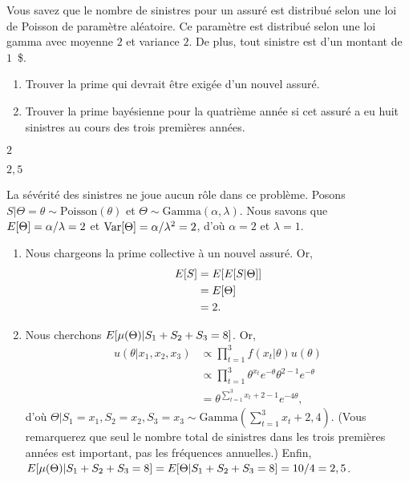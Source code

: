 \begin{exercice}
  Vous savez que le nombre de sinistres pour un assuré est distribué
  selon une loi de Poisson de paramètre aléatoire. Ce paramètre est
  distribué selon une loi gamma avec moyenne $2$ et variance $2$. De plus,
  tout sinistre est d'un montant de $1$~\$.
  \begin{enumerate}
  \item Trouver la prime qui devrait être exigée d'un nouvel assuré.
  \item Trouver la prime bayésienne pour la quatrième année si cet
    assuré a eu huit sinistres au cours des trois premières années.
  \end{enumerate}
  \begin{rep}
    \begin{inparaenum}
    \item $2$
    \item $2,5$
    \end{inparaenum}
  \end{rep}
  \begin{sol}
    La sévérité des sinistres ne joue aucun rôle dans ce problème.
    Posons $S|\Theta = \theta \sim \text{Poisson}(\theta)$ et
    $\Theta \sim \text{Gamma}(\alpha, \lambda)$. Nous savons que
    $E [ \Theta ] = \alpha/\lambda = 2$ et
    $\operatorname{Var} [ \Theta ] = \alpha/\lambda^2 = 2$, d'où $\alpha = 2$ et
    $\lambda = 1$.
    \begin{enumerate}
    \item Nous chargeons la prime collective à un nouvel assuré. Or,
      \begin{align*}
        E [ S ]
        &= E [ E [ S|\Theta ] ] \\
        &= E [ \Theta ] \\
        &= 2.
      \end{align*}
    \item Nous cherchons $E [ \mu(\Theta)|S_1 + S_2 + S_3 = 8 ]$. Or,
      \begin{align*}
        u(\theta|x_1, x_2, x_3)
        &\propto \prod_{t = 1}^3 f(x_t|\theta) u(\theta) \\
        &\propto \prod_{t = 1}^3 \theta^{x_t} e^{-\theta}
        \theta^{2 - 1} e^{-\theta} \\
        &= \theta^{\sum_{t = 1}^3 x_t + 2 - 1} e^{-4 \theta},
      \end{align*}
      d'où
      $\Theta|S_1 = x_1, S_2 = x_2, S_3 = x_3 \sim
      \text{Gamma}(\sum_{t = 1}^3 x_t + 2, 4)$. (Vous remarquerez que
      seul le nombre total de sinistres dans les trois premières
      années est important, pas les fréquences annuelles.) Enfin,
      $E [ \mu(\Theta)|S_1 + S_2 + S_3 = 8 ] = E [ \Theta|S_1 + S_2 +
        S_3 = 8 ] = 10/4 = 2,5$.
    \end{enumerate}
  \end{sol}
\end{exercice}

